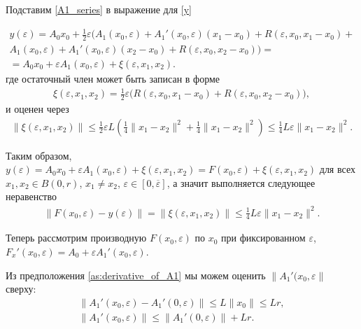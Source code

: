 \documentclass[../main.tex]{subfiles}
\begin{document}
Подставим \eqref{A1_series} в выражение для \eqref{y}

\begin{gather*}
    y(\varepsilon) =
    A_0x_0 +
    \frac{1}{2}\varepsilon \Big(
    A_1(x_0,\varepsilon) +
    A_1'(x_0,\varepsilon)(x_1 - x_0)+ 
    R(\varepsilon, x_0, x_1 - x_0) + \\ 
    A_1(x_0,\varepsilon) +
    A_1'(x_0,\varepsilon)(x_2 - x_0)+ 
    R(\varepsilon, x_0, x_2 - x_0)
    \Big) = \\ = 
    A_0x_0 + 
    \varepsilon A_1(x_0,\varepsilon) +
    \xi(\varepsilon,x_1,x_2).
\end{gather*}
где остаточный член может быть записан в форме
\begin{gather*}
    \xi(\varepsilon,x_1,x_2) = \frac{1}{2}\varepsilon\big(R(\varepsilon, x_0, x_1 - x_0) + R(\varepsilon, x_0, x_2 - x_0)\big),
\end{gather*}
и оценен через
\begin{gather*}
    \|\xi(\varepsilon,x_1,x_2)\| \leqslant \frac{1}{2}\varepsilon L \left(\frac{1}{4}\|x_1 - x_2\|^2 + \frac{1}{4}\|x_1 - x_2\|^2 \right) \leqslant \frac{1}{4}L\varepsilon\|x_1 - x_2\|^2.   
\end{gather*}

Таким образом, $y(\varepsilon) = A_0x_0 + \varepsilon A_1(x_0,\varepsilon) + \xi(\varepsilon,x_1,x_2) = F(x_0,\varepsilon) + \xi(\varepsilon,x_1,x_2)$ для всех $x_1, x_2 \in B(0,r)$, $x_1 \neq x_2$, $\varepsilon \in [0, \overline{\varepsilon}]$, а значит выполняется следующее неравенство
\begin{gather*}
    \| F(x_0,\varepsilon) - y(\varepsilon) \| = \|\xi(\varepsilon,x_1,x_2)\| \leqslant \frac{1}{4}L\varepsilon\|x_1-x_2\|^2.
\end{gather*}


Теперь рассмотрим производную $F(x_0, \varepsilon)$ по $x_0$ при фиксированном $\varepsilon$, $F_x'(x_0,\varepsilon) = A_0 + \varepsilon A_1'(x_0,\varepsilon) $.

Из предположения \ref{as:derivative_of_A1} мы можем оценить $\|A_1'(x_0,\varepsilon\|$ сверху:
\begin{gather*}
    \|A_1'(x_0,\varepsilon) - A_1'(0,\varepsilon)\| \leqslant 
    L\|x_0\| \leqslant
    L r, \\
    \|A_1'(x_0,\varepsilon)\|  \leqslant \| A_1'(0,\varepsilon)\| + Lr.
\end{gather*}
\end{document}
